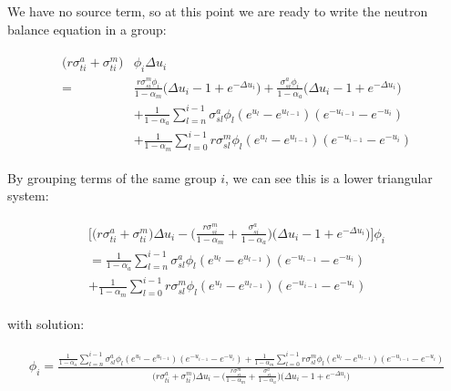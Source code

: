 \documentclass{article}
\begin{document}
        We have no source term, so at this point we are ready to write the neutron balance equation in a 
        group:

        \begin{align}
        \begin{split}
            \label{eq:balance_group}
            \big( r \sigma_{ti}^a + \sigma_{ti}^m  \big) &\phi_i \Delta u_i \\=
            &\frac{r \sigma_{si}^m \phi_i}{1-\alpha_m} \big( \Delta u_i -1 + e^{-\Delta u_i} \big)+
            \frac{\sigma_{si}^a \phi_i}{1-\alpha_a} \big( \Delta u_i -1 + e^{-\Delta u_i} \big) \\ 
            & + \frac{1}{1-\alpha_a} 
                \sum_{l = n}^{i-1} \sigma_{sl}^a \phi_l  (e^{u_l} - e^{u_{l-1}})   (e^{-u_{i-1}} - e^{-u_{i}}) \\ 
            & + \frac{1}{1-\alpha_m} 
                \sum_{l = 0}^{i-1} r \sigma_{sl}^m \phi_l  (e^{u_l} - e^{u_{l-1}}) (e^{-u_{i-1}} - e^{-u_{i}}) 
        \end{split}
        \end{align}

        By grouping terms of the same group $i$, we can see this is a lower triangular system:

        \begin{align}
        \begin{split}
            \label{eq:ltri}
            \bigg[ 
                \bigg( r \sigma_{ti}^a + \sigma_{ti}^m  \bigg) \Delta u_i  - 
                \bigg( \frac{r \sigma_{si}^m }{1-\alpha_m} + \frac{\sigma_{si}^a }{1-\alpha_a}  \bigg)
                \bigg( \Delta u_i -1 + e^{-\Delta u_i} \bigg) 
            \bigg] \phi_i \\ =
              \frac{1}{1-\alpha_a} 
                \sum_{l = n}^{i-1} \sigma_{sl}^a \phi_l  (e^{u_l} - e^{u_{l-1}})   (e^{-u_{i-1}} - e^{-u_{i}}) \\ 
             + \frac{1}{1-\alpha_m} 
                \sum_{l = 0}^{i-1} r \sigma_{sl}^m \phi_l  (e^{u_l} - e^{u_{l-1}}) (e^{-u_{i-1}} - e^{-u_{i}}) 
        \end{split}
        \end{align}

        with solution:
        
        \begin{align}
        \begin{split}
            \label{eq:soln}
            \phi_i =
            \frac{
               \frac{1}{1-\alpha_a} 
                \sum_{l = n}^{i-1} \sigma_{sl}^a \phi_l  (e^{u_l} - e^{u_{l-1}})   (e^{-u_{i-1}} - e^{-u_{i}}) 
             + \frac{1}{1-\alpha_m} 
                \sum_{l = 0}^{i-1} r \sigma_{sl}^m \phi_l  (e^{u_l} - e^{u_{l-1}}) (e^{-u_{i-1}} - e^{-u_{i}}) 
            }
            {  
                \bigg( r \sigma_{ti}^a + \sigma_{ti}^m  \bigg) \Delta u_i  - 
                \bigg( \frac{r \sigma_{si}^m }{1-\alpha_m} + \frac{\sigma_{si}^a }{1-\alpha_a}  \bigg)
                \bigg( \Delta u_i -1 + e^{-\Delta u_i} \bigg) 
             }
        \end{split}
        \end{align}
\end{document}
